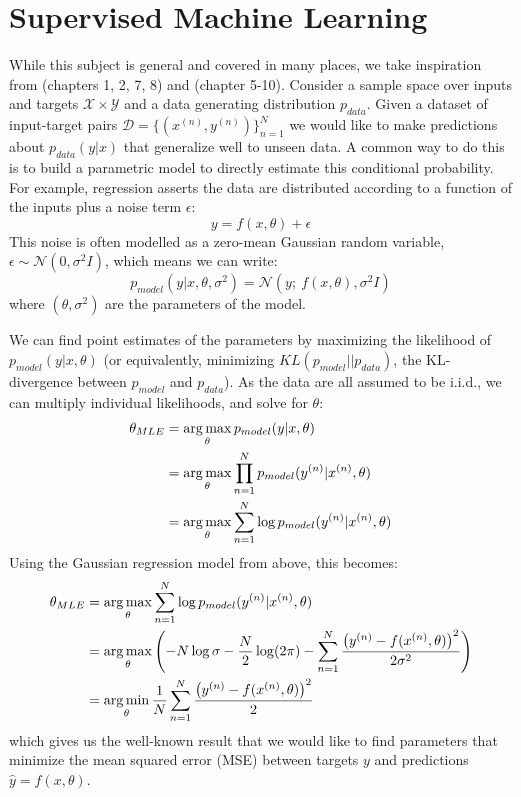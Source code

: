 \section{Supervised Machine Learning}
While this subject is general and covered in many places, we take inspiration
from \cite{murphy_machine_2012} (chapters 1, 2, 7, 8) and
\cite{goodfellow_deep_2016} (chapter 5-10).
Consider a sample space over inputs and targets $\mathcal{X} \times \mathcal{Y}$
and a data generating distribution $p_{data}$. Given a dataset of input-target
pairs $\mathcal{D} = \{(x^{(n)}, y^{(n)})\}_{n=1}^N$ we would like to make
predictions about $p_{data}(y|x)$ that generalize well to unseen data. A common
way to do this is to build a parametric model to directly estimate this
conditional probability.  For example, regression asserts the data are
distributed according to a function of the inputs plus a noise term $\epsilon$:
\begin{equation}
  y = f(x, \theta) + \epsilon
\end{equation}
This noise is often modelled as a zero-mean Gaussian random variable, $\epsilon
\sim \mathcal{N}(0, \sigma^2I)$, which means we can write:
\begin{equation}\label{eq:ch2:regression}
  p_{model}(y|x, \theta, \sigma^2) = \mathcal{N}(y;\ f(x, \theta), \sigma^2I)
\end{equation}
where $(\theta, \sigma^2)$ are the parameters of the model. 

We can find point estimates of the parameters by maximizing the likelihood of
$p_{model}(y|x, \theta)$ (or equivalently, minimizing $KL(p_{model}||p_{data})$, the KL-divergence between
$p_{model}$ and $p_{data}$). As the data are all assumed to be
i.i.d., we can multiply individual likelihoods, and solve for $\theta$:
\begin{align}
  \theta_{MLE} &= \operatorname*{arg\,max}_{\theta} p_{model}(y|x, \theta) \\
              &= \operatorname*{arg\,max}_{\theta} \prod_{n=1}^{N} p_{model}(y^{(n)}|x^{(n)}, \theta) \\
              &= \operatorname*{arg\,max}_{\theta} \sum_{n=1}^N \log p_{model}(y^{(n)}|x^{(n)}, \theta)
\end{align}
Using the Gaussian regression model from above, this becomes:
\begin{align} 
  \theta_{MLE} &= \operatorname*{arg\,max}_{\theta} \sum_{n=1}^N \log p_{model}(y^{(n)}|x^{(n)}, \theta) \\
              &= \operatorname*{arg\,max}_{\theta} \left(-N\log \sigma - \frac{N}{2}\log (2\pi) - \sum_{n=1}^{N}
                  \frac{\left(y^{(n)} - f(x^{(n)}, \theta)\right)^2}{2\sigma^2}\right) \\
                  &= \operatorname*{arg\,min}_{\theta}\frac{1}{N}\sum_{n=1}^{N} \frac{\left(y^{(n)} - f(x^{(n)}, \theta)\right)^2}{2} \label{eq:ch2:mle_reg}
\end{align}
which gives us the well-known result that we would like to find parameters that
minimize the mean squared error (MSE) between targets $y$ and predictions
$\hat{y} = f(x, \theta)$.


